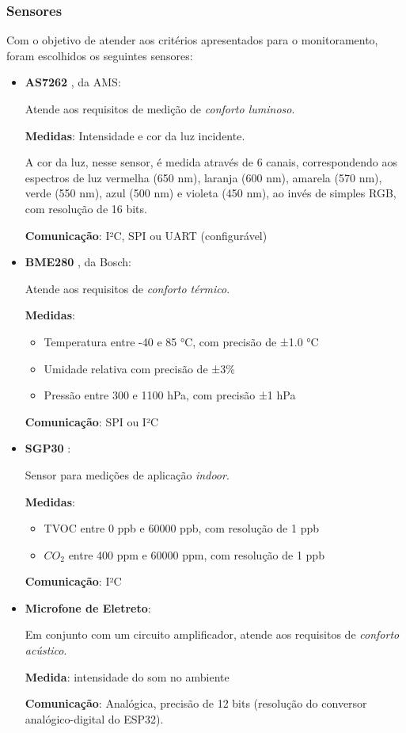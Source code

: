 \documentclass[../monografia.tex]{subfiles}
\begin{document}
\subsubsection{Sensores}
Com o objetivo de atender aos critérios apresentados para o monitoramento, foram escolhidos os seguintes sensores: 
\begin{itemize}
\item \textbf{AS7262} \cite{as7262}, da AMS: 

Atende aos requisitos de medição de \textit{conforto luminoso}. 

\textbf{Medidas}: Intensidade e cor da luz incidente.

A cor da luz, nesse sensor, é medida através de 6 canais, correspondendo aos espectros de luz vermelha (650 nm), laranja (600 nm), amarela (570 nm), verde (550 nm), azul (500 nm) e violeta (450 nm), ao invés de simples RGB, com resolução de 16 bits.

\textbf{Comunicação}: I²C, SPI ou UART (configurável)

\item \textbf{BME280} \cite{bme280}, da Bosch: 

Atende aos requisitos de \textit{conforto térmico}. 

\textbf{Medidas}: 
    \begin{itemize}
    \item Temperatura entre -40 e 85 °C, com precisão de ±1.0 °C
    \item Umidade relativa com precisão de ±3\%
    \item Pressão entre 300 e 1100 hPa, com precisão ±1 hPa
    \end{itemize}

\textbf{Comunicação}: SPI ou I²C

\item \textbf{SGP30} \cite{sgp30}:

Sensor para medições de aplicação \textit{indoor}. 

\textbf{Medidas}:
    \begin{itemize}
    \item TVOC entre 0 ppb e 60000 ppb, com resolução de 1 ppb
    \item $CO_{2}$ entre 400 ppm e 60000 ppm, com resolução de 1 ppb
    \end{itemize}

\textbf{Comunicação}: I²C

\item \textbf{Microfone de Eletreto}:

Em conjunto com um circuito amplificador, atende aos requisitos de \textit{conforto acústico}. 

\textbf{Medida}: intensidade do som no ambiente

\textbf{Comunicação}: Analógica, precisão de 12 bits (resolução do conversor analógico-digital do ESP32). 
\end{itemize}
\end{document}
